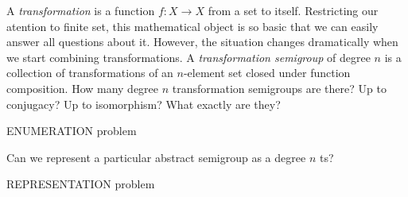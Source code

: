 \documentclass{amsart}
\begin{document}
A \emph{transformation} is a function $f:X\rightarrow X$ from a set to itself.
Restricting our atention to finite set, this mathematical object is so basic that we can easily answer all questions about it.
However, the situation changes dramatically when we start combining transformations.
A \emph{transformation semigroup} of degree $n$ is a collection of transformations of an $n$-element set closed under function composition.
How many degree $n$ transformation semigroups are there? Up to conjugacy? Up to isomorphism? What exactly are they?

ENUMERATION problem

Can we represent a particular abstract semigroup as a degree $n$ ts?

REPRESENTATION problem
\end{document}
